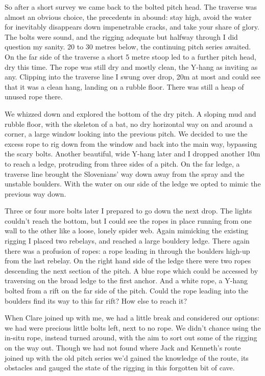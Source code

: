 So after a short survey we came back to the bolted pitch head. The traverse was almost an obvious choice, the precedents in  abound: stay high, avoid the water for inevitably disappears down impenetrable cracks, and take your share of glory. The bolts were sound, and the rigging adequate but halfway through I did question my sanity. 20 to 30 metres below, the continuing pitch series awaited. On the far side of the traverse a short 5 metre stoop led to a further pitch head, dry this time. The rope was still dry and mostly clean, the Y-hang as inviting as any. Clipping into the traverse line I swung over drop, 20m at most and could see that it was a clean hang, landing on a rubble floor. There was still a heap of unused rope there. 

We whizzed down and explored the bottom of the dry pitch. A sloping mud and rubble floor, with the skeleton of a bat, no dry horizontal way on and around a corner, a large window looking into the previous pitch. We decided to use the excess rope to rig down from the window and back into the main way, bypassing the scary bolts. Another beautiful, wide Y-hang later and I dropped another 10m to reach a ledge, protruding from three sides of a pitch. On the far ledge, a traverse line brought the Slovenians' way down away from the spray and the unstable boulders. With the water on our side of the ledge we opted to mimic the previous way down. 



Three or four more bolts later I prepared to go down the next drop. The lights couldn't reach the bottom, but I could see the ropes in place running from one wall to the other like a loose, lonely spider web. Again mimicking the existing rigging I placed two rebelays, and reached a large bouldery ledge. There again there was a profusion of ropes: a rope leading in through the boulders high-up from the last rebelay. On the right hand side of the ledge there were two ropes descending the next section of the pitch. A blue rope which could be accessed by traversing on the broad ledge to the first anchor. And a white rope, a Y-hang bolted from a rift on the far side of the pitch. Could the rope leading into the boulders find its way to this far rift?  How else to reach it?

When Clare joined up with me, we had a little break and considered our options: we had were precious little bolts left, next to no rope. We didn't chance using the in-situ rope, instead turned around, with the aim to sort out some of the rigging on the way out. Though we had not found where Jack and Kenneth's route joined up with the old pitch series  we'd gained the knowledge of the route, its obstacles and gauged the state of the rigging in this forgotten bit of cave. 

